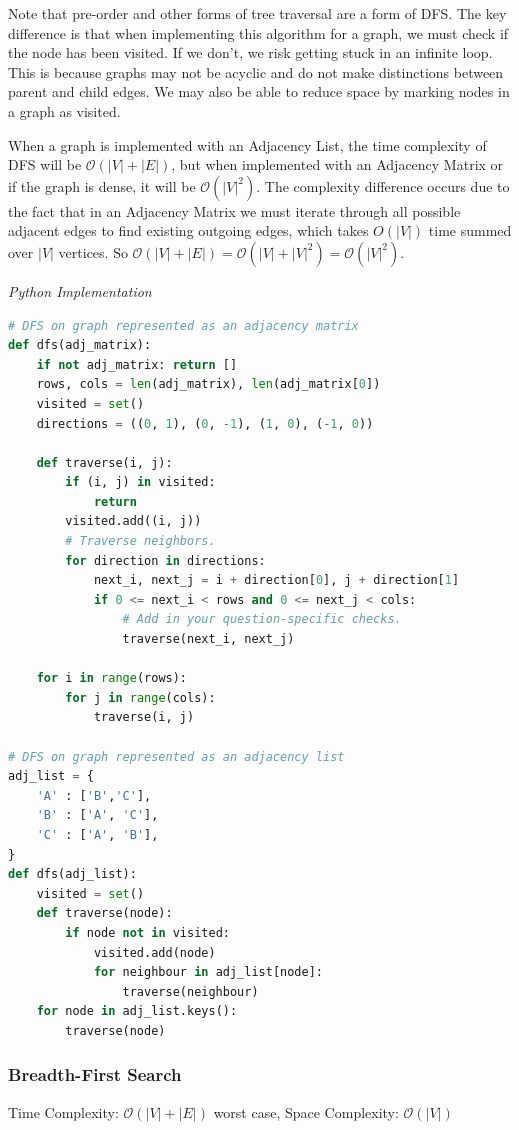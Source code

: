 \documentclass{article}
\newcommand{\bigO}{\mathcal{O}}
\begin{document}
    Note that pre-order and other forms of tree traversal are a form of DFS. The key difference is that when implementing this algorithm for a graph, we must check if the node has been visited. If we don't, we risk getting stuck in an infinite loop. This is because graphs may not be acyclic and do not make distinctions between parent and child edges. We may also be able to reduce space by marking nodes in a graph as visited.
    
    When a graph is implemented with an Adjacency List, the time complexity of DFS will be $\bigO(|V| + |E|)$, but when implemented with an Adjacency Matrix or if the graph is dense, it will be $\bigO(|V|^2)$. The complexity difference occurs due to the fact that in an Adjacency Matrix we must iterate through all possible adjacent edges to find existing outgoing edges, which takes $O(|V|)$ time summed over $|V|$ vertices. So $\bigO(|V| + |E|) = \bigO(|V| + |V|^2) = \bigO(|V|^2)$.
    
\vspace{8pt} \emph{Python Implementation}
\begin{lstlisting}[language=Python]
# DFS on graph represented as an adjacency matrix 
def dfs(adj_matrix):
    if not adj_matrix: return []
    rows, cols = len(adj_matrix), len(adj_matrix[0])
    visited = set()
    directions = ((0, 1), (0, -1), (1, 0), (-1, 0))

    def traverse(i, j):
        if (i, j) in visited:
            return
        visited.add((i, j))
        # Traverse neighbors.
        for direction in directions:
            next_i, next_j = i + direction[0], j + direction[1]
            if 0 <= next_i < rows and 0 <= next_j < cols:
                # Add in your question-specific checks.
                traverse(next_i, next_j)

    for i in range(rows):
        for j in range(cols):
            traverse(i, j)

# DFS on graph represented as an adjacency list
adj_list = {
    'A' : ['B','C'],
    'B' : ['A', 'C'],
    'C' : ['A', 'B'],
}
def dfs(adj_list):
    visited = set()
    def traverse(node):
        if node not in visited:
            visited.add(node)
            for neighbour in adj_list[node]:
                traverse(neighbour)
    for node in adj_list.keys():
        traverse(node)
\end{lstlisting}

    \subsubsection{Breadth-First Search}
    Time Complexity: $\bigO(|V| + |E|)$ worst case, Space Complexity: $\bigO(|V|)$
    
\end{document}
